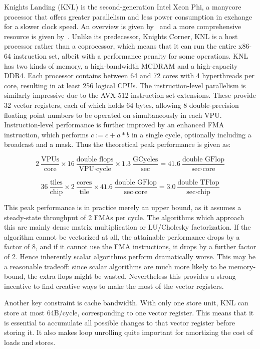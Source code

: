Knights Landing (KNL) is the second-generation Intel Xeon Phi, a manycore processor that offers greater parallelism and less power consumption in exchange for a slower clock speed. An overview is given by~\cite{Sodani:2016:KLS:2927511.2927563} and a more comprehensive resource is given by~\cite{Jeffers:2016:IXP:3050856}. Unlike its predecessor, Knights Corner, KNL is a host processor rather than a coprocessor, which means that it can run the entire x86-64 instruction set, albeit with a performance penalty for some operations. KNL has two kinds of memory, a high-bandwidth MCDRAM and a high-capacity DDR4. Each processor contains between 64 and 72 cores with 4 hyperthreads per core, resulting in at least 256 logical CPUs. The instruction-level parallelism is similarly impressive due to the AVX-512 instruction set extensions. These provide 32 vector registers, each of which holds 64 bytes, allowing 8 double-precision floating point numbers to be operated on simultaneously in each \gls{VPU}. Instruction-level performance is further improved by an enhanced \gls{FMA} instruction, which performs $c := c + a*b$ in a single cycle, optionally including a broadcast and a mask. Thus the theoretical peak performance is given as:

\[
2~\frac{\text{VPUs}}{\text{core}} \times 16~\frac{\text{double flops}}{\text{VPU} \cdot \text{cycle}} \times 1.3~\frac{\text{GCycles}}{\text{sec}} = 41.6~\frac{\text{double GFlop}}{\text{sec}\cdot \text{core}}
  \label{eq:knl_peak_perf}
\]

\[
36~\frac{\text{tiles}}{\text{chip}} \times 2~\frac{\text{cores}}{\text{tile}} \times 41.6~\frac{\text{double~GFlop}}{\text{sec}\cdot \text{core}} = 3.0~\frac{\text{double TFlop}}{\text{sec}\cdot \text{chip}}
  \label{eq:knl_peak_perf}
\]

This peak performance is in practice merely an upper bound, as it assumes a steady-state throughput of 2 FMAs per cycle. The algorithms which approach this are mainly dense matrix multiplication or LU/Cholesky factorization. If the algorithm cannot be vectorized at all, the attainable performance drops by a factor of 8, and if it cannot use the FMA instructions, it drops by a further factor of 2. Hence inherently scalar algorithms perform dramatically worse. This may be a reasonable tradeoff: since scalar algorithms are much more likely to be memory-bound, the extra flops might be wasted. Nevertheless this provides a strong incentive to find creative ways to make the most of the vector registers. 

Another key constraint is cache bandwidth. With only one store unit, KNL can store at most 64B/cycle, corresponding to one vector register. This means that it is essential to accumulate all possible changes to that vector register before storing it. It also makes loop unrolling quite important for amortizing the cost of loads and stores.

